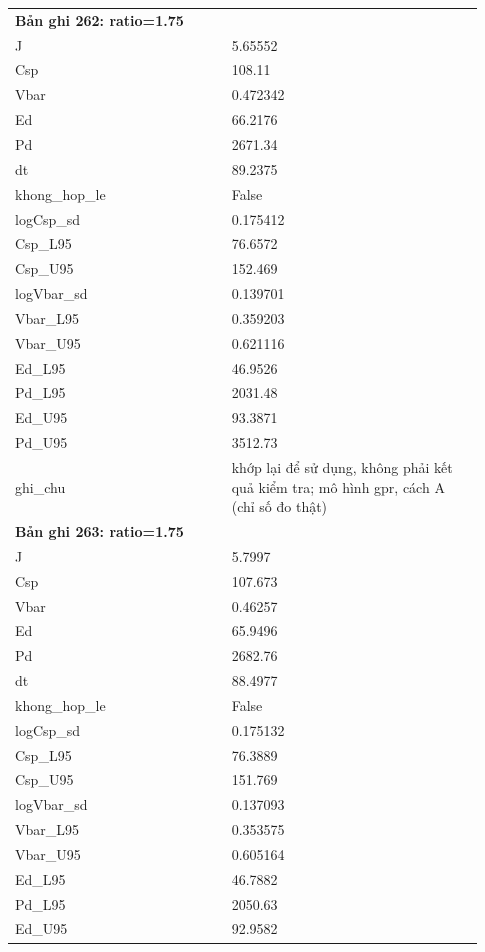 \begin{longtable}{p{0.43\linewidth}p{0.50\linewidth}}
\midrule
\multicolumn{2}{p{0.95\linewidth}}{\textbf{Bản ghi 262: ratio=1.75}} \\
J & 5.65552 \\
Csp & 108.11 \\
Vbar & 0.472342 \\
Ed & 66.2176 \\
Pd & 2671.34 \\
dt & 89.2375 \\
khong\_\allowbreak hop\_\allowbreak le & False \\
logCsp\_\allowbreak sd & 0.175412 \\
Csp\_\allowbreak L95 & 76.6572 \\
Csp\_\allowbreak U95 & 152.469 \\
logVbar\_\allowbreak sd & 0.139701 \\
Vbar\_\allowbreak L95 & 0.359203 \\
Vbar\_\allowbreak U95 & 0.621116 \\
Ed\_\allowbreak L95 & 46.9526 \\
Pd\_\allowbreak L95 & 2031.48 \\
Ed\_\allowbreak U95 & 93.3871 \\
Pd\_\allowbreak U95 & 3512.73 \\
ghi\_\allowbreak chu & khớp lại để sử dụng, không phải kết quả kiểm tra; mô hình gpr, cách A (chỉ số đo thật) \\
\midrule
\multicolumn{2}{p{0.95\linewidth}}{\textbf{Bản ghi 263: ratio=1.75}} \\
J & 5.7997 \\
Csp & 107.673 \\
Vbar & 0.46257 \\
Ed & 65.9496 \\
Pd & 2682.76 \\
dt & 88.4977 \\
khong\_\allowbreak hop\_\allowbreak le & False \\
logCsp\_\allowbreak sd & 0.175132 \\
Csp\_\allowbreak L95 & 76.3889 \\
Csp\_\allowbreak U95 & 151.769 \\
logVbar\_\allowbreak sd & 0.137093 \\
Vbar\_\allowbreak L95 & 0.353575 \\
Vbar\_\allowbreak U95 & 0.605164 \\
Ed\_\allowbreak L95 & 46.7882 \\
Pd\_\allowbreak L95 & 2050.63 \\
Ed\_\allowbreak U95 & 92.9582 \\

\end{longtable}

